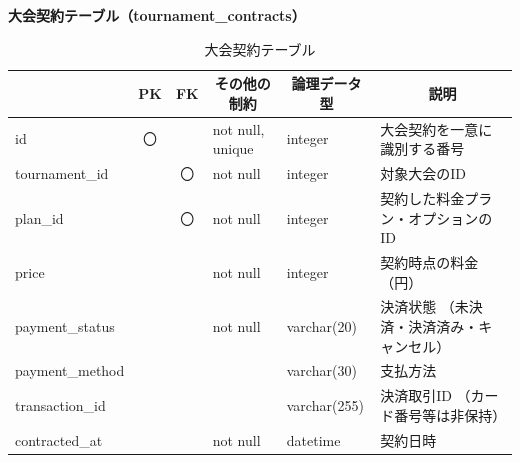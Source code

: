 \noindent\textbf{大会契約テーブル（tournament\_contracts）}
\begin{table}[H]
    \centering
    \caption{大会契約テーブル}
    \label{tab:tournament_contracts_table}
    \begin{tabularx}{\linewidth}{|l|c|c|l|l|X|}
        \hline
        \rowcolor{tableblue}
        \multicolumn{1}{|c|}{カラム名} & \multicolumn{1}{c|}{PK} & \multicolumn{1}{c|}{FK} & \multicolumn{1}{c|}{その他の制約} & \multicolumn{1}{c|}{論理データ型} & \multicolumn{1}{c|}{説明} \\ \hline
        id & 〇 & & not null, unique & integer & 大会契約を一意に識別する番号 \\ \hline
        tournament\_id & & 〇 & not null & integer & 対象大会のID \\ \hline
        plan\_id & & 〇 & not null & integer & 契約した料金プラン・オプションのID \\ \hline
        price & & & not null & integer & 契約時点の料金（円） \\ \hline
        payment\_status & & & not null & varchar(20) & 決済状態 \newline（未決済・決済済み・キャンセル） \\ \hline
        payment\_method & & & & varchar(30) & 支払方法 \\ \hline
        transaction\_id & & & & varchar(255) & 決済取引ID \newline（カード番号等は非保持） \\ \hline
        contracted\_at & & & not null & datetime & 契約日時 \\ \hline
    \end{tabularx}
\end{table}

